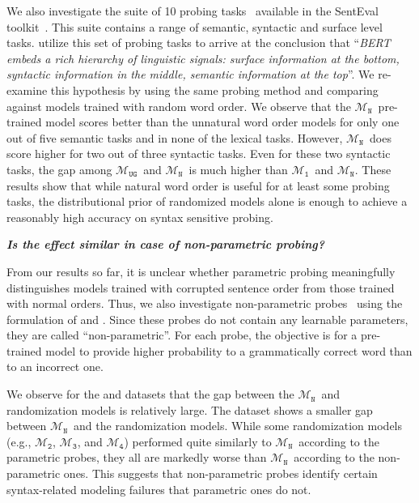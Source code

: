 \documentclass[12pt]{article}
\newcommand{\xit}[1]{{\noindent\textbf{\textit{#1}}}}
\newcommand{\OR}{$\mathcal{M}_{\texttt{N}}$}
\newcommand{\RI}{$\mathcal{M}_{\texttt{1}}$}
\newcommand{\RII}{$\mathcal{M}_{\texttt{2}}$}
\newcommand{\RIII}{$\mathcal{M}_{\texttt{3}}$}
\newcommand{\RIV}{$\mathcal{M}_{\texttt{4}}$}
\newcommand{\RC}{$\mathcal{M}_{\texttt{UG}}$}
\begin{document}
We also investigate the suite of 10 probing tasks~\cite{conneau-etal-2018-cram} available in the SentEval toolkit~\cite{conneau-kiela-2018-senteval}. This suite contains a range of semantic, syntactic and surface level tasks. \citet{jawahar2019a} utilize this set of probing tasks to arrive at the conclusion that %
``\textit{BERT embeds a rich hierarchy of linguistic signals: surface information at the bottom, syntactic information in the middle, semantic information at the top}''. We re-examine this hypothesis by using the same probing method and comparing against models trained with random word order. We observe that the \OR\ pre-trained model scores better than the unnatural word order models for only one out of five semantic tasks and in none of the lexical tasks. However, \OR\ does score higher for two out of three syntactic tasks. Even for these two syntactic tasks, the gap among \RC\ and \OR\ is much higher than \RI\ and \OR. These results show that while natural word order is useful for at least some probing tasks, the distributional prior of randomized models alone is enough to achieve a reasonably high accuracy on syntax sensitive probing.


\xit{Is the effect similar in case of non-parametric probing?}

From our results so far, it is unclear whether parametric probing meaningfully distinguishes models trained with corrupted sentence order from those trained with normal orders. Thus, we also investigate non-parametric probes~\cite{linzen-etal-2016-assessing,marvin-linzen-2018-targeted,gulordava2018} using the formulation of \citet{goldberga} and \citet{wolf2019}. Since these probes do not contain any learnable parameters, they are called ``non-parametric''. For each probe, the objective is for a pre-trained model to provide higher probability to a grammatically correct word than to an incorrect one.

We observe for the \citet{linzen-etal-2016-assessing} and \citet{marvin-linzen-2018-targeted} datasets that the gap between the \OR\ and randomization models is relatively large.
The \citet{gulordava2018} dataset shows a smaller gap between \OR\ and the randomization models. While some randomization models (e.g., \RII, \RIII, and \RIV) performed quite similarly to \OR\ according to the parametric probes, they all are markedly worse than \OR\ according to the non-parametric ones. This suggests that non-parametric probes identify certain syntax-related modeling failures
that parametric ones do not.
\end{document}
